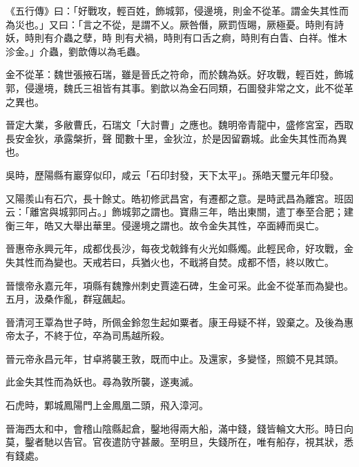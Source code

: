 
\begin{pinyinscope}

 《五行傳》曰：「好戰攻，輕百姓，飾城郭，侵邊境，則金不從革。謂金失其性而為災也。」又曰：「言之不從，是謂不乂。厥咎僭，厥罰恆晹，厥極憂。時則有詩妖，時則有介蟲之孽，時
 則有犬禍，時則有口舌之痾，時則有白眚、白祥。惟木沴金。」介蟲，劉歆傳以為毛蟲。



 金不從革：魏世張掖石瑞，雖是晉氏之符命，而於魏為妖。好攻戰，輕百姓，飾城郭，侵邊境，魏氏三祖皆有其事。劉歆以為金石同類，石圖發非常之文，此不從革之異也。



 晉定大業，多敝曹氏，石瑞文「大討曹」之應也。魏明帝青龍中，盛修宮室，西取長安金狄，承露槃折，聲
 聞數十里，金狄泣，於是因留霸城。此金失其性而為異也。



 吳時，歷陽縣有巖穿似印，咸云「石印封發，天下太平」。孫皓天璽元年印發。



 又陽羨山有石穴，長十餘丈。皓初修武昌宮，有遷都之意。是時武昌為離宮。班固云：「離宮與城郭同占。」飾城郭之謂也。寶鼎三年，皓出東關，遣丁奉至合肥；建衡三年，皓又大舉出華里。侵邊境之謂也。故令金失其性，卒面縛而吳亡。



 晉惠帝永興元年，成都伐長沙，每夜戈戟鋒有火光如縣燭。此輕民命，好攻戰，金失其性而為變也。天戒若曰，兵猶火也，不戢將自焚。成都不悟，終以敗亡。



 晉懷帝永嘉元年，項縣有魏豫州刺史賈逵石碑，生金可采。此金不從革而為變也。五月，汲桑作亂，群寇飆起。



 晉清河王覃為世子時，所佩金鈴忽生起如粟者。康王母疑不祥，毀棄之。及後為惠帝太子，不終于位，卒為司馬越所殺。



 晉元帝永昌元年，甘卓將襲王敦，既而中止。及還家，多變怪，照鏡不見其頭。



 此金失其性而為妖也。尋為敦所襲，遂夷滅。



 石虎時，鄴城鳳陽門上金鳳凰二頭，飛入漳河。



 晉海西太和中，會稽山陰縣起倉，鑿地得兩大船，滿中錢，錢皆輪文大形。時日向莫，鑿者馳以告官。官夜遣防守甚嚴。至明旦，失錢所在，唯有船存，視其狀，悉有錢處。




\end{pinyinscope}
